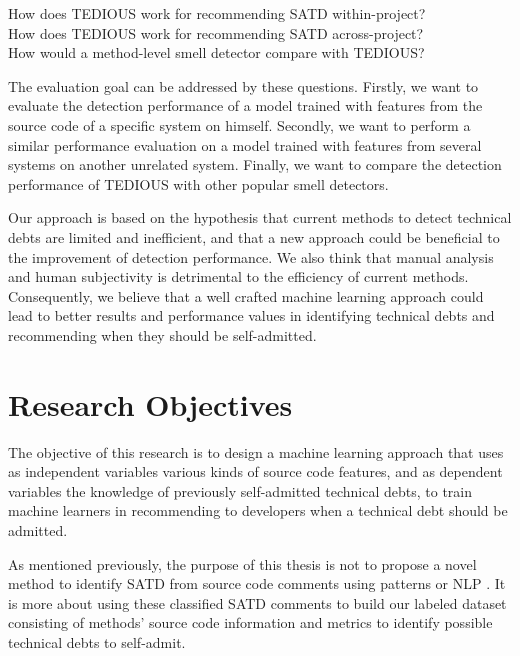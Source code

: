 \begin{center}
\begin{framed}
	 \noindent How does \ac{TEDIOUS} work for recommending \ac{SATD} within-project? \\
	 How does \ac{TEDIOUS} work for recommending SATD across-project? \\
	 How would a method-level smell detector compare with \ac{TEDIOUS}?
\end{framed}
\end{center}
	
The evaluation goal can be addressed by these questions. Firstly, we want to evaluate the detection performance of a model trained with features from the source code of a specific system on himself. Secondly, we want to perform a similar performance evaluation on a model trained with features from several systems on another unrelated system. Finally, we want to compare the detection performance of TEDIOUS with other popular smell detectors.

Our approach is based on the hypothesis that current methods to detect technical debts are limited and inefficient, and that a new approach could be beneficial to the improvement of detection performance. We also think that manual analysis and human subjectivity is detrimental to the efficiency of current methods. Consequently, we believe that a well crafted machine learning approach could lead to better results and performance values in identifying technical debts and recommending when they should be self-admitted. \par

\section{Research Objectives}  


\begin{center}
\begin{framed}
	\noindent The objective of this research is to design a machine learning approach that uses as independent variables various kinds of source code features, and as dependent variables the knowledge of previously self-admitted technical debts, to train machine learners in recommending to developers when a technical debt should be admitted.
\end{framed}
\end{center}

As mentioned previously, the purpose of this thesis is not to propose a novel method to identify SATD from source code comments using patterns or \ac{NLP} \citep{MaldonadoNLP,PotdarS14}. It is more about using these classified SATD comments to build our labeled dataset consisting of methods' source code information and metrics to identify possible technical debts to self-admit. \par
 
